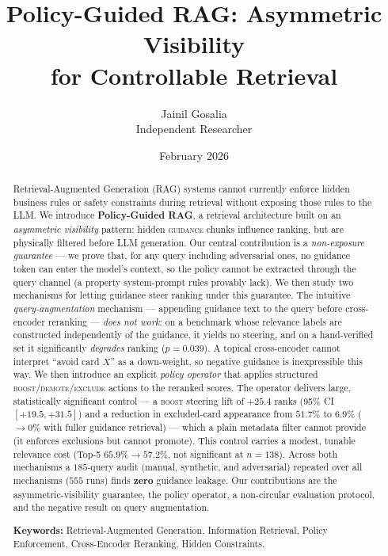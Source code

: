 \documentclass[11pt]{article}
\title{\textbf{Policy-Guided RAG: Asymmetric Visibility\\ for Controllable Retrieval}}
\author{Jainil Gosalia\\\small Independent Researcher}
\date{February 2026}
\newcommand{\guidance}{\textsc{guidance}}
\begin{document}
\maketitle

\begin{abstract}
Retrieval-Augmented Generation (RAG) systems cannot currently enforce hidden business rules
or safety constraints during retrieval without exposing those rules to the LLM. We introduce
\textbf{Policy-Guided RAG}, a retrieval architecture built on an \emph{asymmetric visibility}
pattern: hidden \guidance{} chunks influence ranking, but are physically filtered before LLM
generation. Our central contribution is a \emph{non-exposure guarantee} --- we prove that, for
any query including adversarial ones, no guidance token can enter the model's context, so the
policy cannot be extracted through the query channel (a property system-prompt rules provably
lack). We then study two mechanisms for letting guidance steer ranking under this guarantee. The intuitive
\emph{query-augmentation} mechanism --- appending guidance text to the query before
cross-encoder reranking --- \emph{does not work}: on a benchmark whose relevance labels are
constructed independently of the guidance, it yields no steering, and on a hand-verified set
it significantly \emph{degrades} ranking ($p{=}0.039$). A topical cross-encoder cannot
interpret ``avoid card $X$'' as a down-weight, so negative guidance is inexpressible this way.
We then introduce an explicit \emph{policy operator} that applies structured
\textsc{boost}/\textsc{demote}/\textsc{exclude} actions to the reranked scores. The operator
delivers large, statistically significant control --- a \textsc{boost} steering lift of
$+25.4$ ranks (95\% CI $[+19.5,+31.5]$) and a reduction in excluded-card appearance from
$51.7\%$ to $6.9\%$ ($\to 0\%$ with fuller guidance retrieval) --- which a plain metadata filter
cannot provide (it enforces exclusions but cannot promote). This control carries a modest,
tunable relevance cost (Top-5 $65.9\%\!\to\!57.2\%$, not significant at $n{=}138$).
Across both mechanisms a $185$-query audit (manual, synthetic, and adversarial) repeated over
all mechanisms ($555$ runs) finds \textbf{zero} guidance leakage. Our contributions are the
asymmetric-visibility guarantee, the policy operator, a non-circular evaluation protocol, and
the negative result on query augmentation.

\vspace{4pt}
\noindent\textbf{Keywords:} Retrieval-Augmented Generation, Information Retrieval, Policy
Enforcement, Cross-Encoder Reranking, Hidden Constraints.
\end{abstract}
\end{document}
